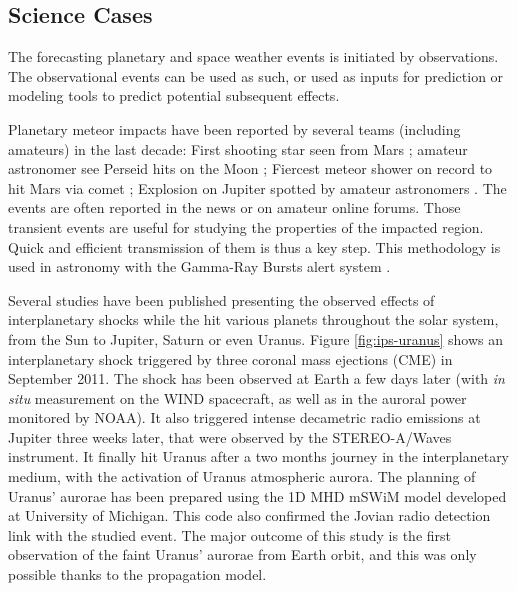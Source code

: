 \documentclass[referee,a4paper,12pt,traditabstract]{swsc}
\begin{document}
\begin{linenumbers}
\section{Science Cases}
The forecasting planetary and space weather events is initiated by observations. The observational events can be used as such, or used as inputs for prediction or modeling tools to predict potential subsequent effects. 

Planetary meteor impacts have been reported by several teams (including amateurs) in the last decade: First shooting star seen from Mars \cite{Selsis05}; amateur astronomer see Perseid hits on the Moon \cite{Spellman08}; Fiercest meteor shower on record to hit Mars via comet \cite{Grossman13}; Explosion on Jupiter spotted by amateur astronomers \cite{Malik12}. The events are often reported in the news or on amateur online forums. Those transient events are useful for studying the properties of the impacted region. Quick and efficient transmission of them is thus a key step. This methodology is used in astronomy with the Gamma-Ray Bursts alert system \cite{barthelmy08}. 

Several studies have been published \cite{prange04,Lamy12} presenting the observed effects of interplanetary shocks while the hit various planets throughout the solar system, from the Sun to Jupiter, Saturn or even Uranus. Figure \ref{fig:ips-uranus} shows an interplanetary shock triggered by three coronal mass ejections (CME) in September 2011. The shock has been observed at Earth a few days later (with {\it in situ} measurement on the WIND spacecraft, as well as in the auroral power monitored by NOAA). It also triggered intense decametric radio emissions at Jupiter three weeks later, that were observed by the STEREO-A/Waves instrument. It finally hit Uranus after a two months journey in the interplanetary medium, with the activation of Uranus atmospheric aurora. The planning of Uranus' aurorae has been prepared using the 1D MHD mSWiM model \cite{zieger08} developed at University of Michigan. This code also confirmed the Jovian radio detection link with the studied event. The major outcome of this study is the first observation of the faint Uranus' aurorae from Earth orbit, and this was only possible thanks to the propagation model.


\end{linenumbers}
\end{document}
